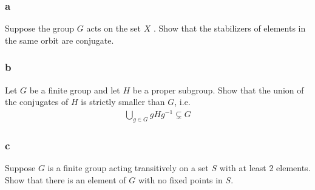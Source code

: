 \hypertarget{a-17}{%
\subsubsection{a}\label{a-17}}

Suppose the group \(G\) acts on the set \(X\) . Show that the
stabilizers of elements in the same orbit are conjugate.

\hypertarget{b-17}{%
\subsubsection{b}\label{b-17}}

Let \(G\) be a finite group and let \(H\) be a proper subgroup. Show
that the union of the conjugates of \(H\) is strictly smaller than
\(G\), i.e.
\begin{align*}
\bigcup_{g\in G} gHg^{-1}\subsetneq G
\end{align*}

\hypertarget{c-10}{%
\subsubsection{c}\label{c-10}}

Suppose \(G\) is a finite group acting transitively on a set \(S\) with
at least 2 elements. Show that there is an element of \(G\) with no
fixed points in \(S\).

